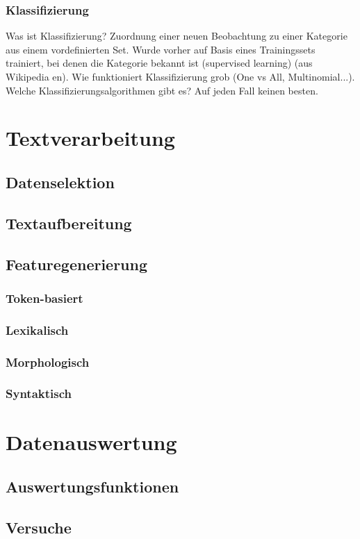 \subsection{Klassifizierung}
Was ist Klassifizierung? Zuordnung einer neuen Beobachtung zu einer Kategorie aus einem vordefinierten Set. Wurde vorher auf Basis eines Trainingssets trainiert, bei denen die Kategorie bekannt ist (supervised learning) (aus Wikipedia en). Wie funktioniert Klassifizierung grob (One vs All, Multinomial...). Welche Klassifizierungsalgorithmen gibt es? Auf jeden Fall keinen besten.

\chapter{Textverarbeitung}
\section{Datenselektion}
\section{Textaufbereitung}
\section{Featuregenerierung}
\subsection{Token-basiert}
\subsection{Lexikalisch}
\subsection{Morphologisch}
\subsection{Syntaktisch}

\chapter{Datenauswertung}
\section{Auswertungsfunktionen}
\section{Versuche}
